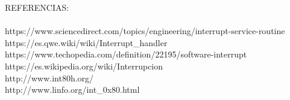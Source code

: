 \documentclass{letter}
\begin{document}
\newpage
REFERENCIAS:\\\\
https://www.sciencedirect.com/topics/engineering/interrupt-service-routine\\
https://es.qwe.wiki/wiki/Interrupt\_handler\\
https://www.techopedia.com/definition/22195/software-interrupt\\
https://es.wikipedia.org/wiki/Interrupcion\\
http://www.int80h.org/\\
http://www.linfo.org/int\_0x80.html\\
\end{document}
